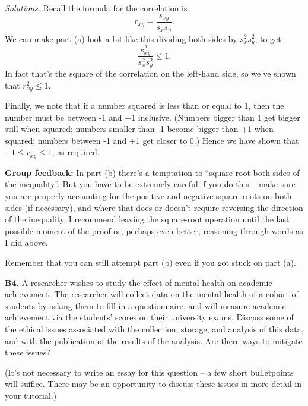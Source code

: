 \documentclass[
  a4paper,
]{book}
\theoremstyle{definition}
\theoremstyle{definition}
\theoremstyle{definition}
\theoremstyle{definition}
\theoremstyle{remark}
\begin{document}
\begin{myanswers}
\emph{Solutions.}
Recall the formula for the correlation is
\[ r_{xy} = \frac{s_{xy}}{s_xs_y} . \]
We can make part (a) look a bit like this dividing both sides by \(s_x^2 s_y^2\), to get
\[\frac{s_{xy}^2}{s_x^2 s_y^2} \leq 1.   \]
In fact that's the square of the correlation on the left-hand side, so we've shown that \(r_{xy}^2 \leq 1\).

Finally, we note that if a number squared is less than or equal to 1, then the number must be between -1 and +1 inclusive. (Numbers bigger than 1 get bigger still when squared; numbers smaller than -1 become bigger than +1 when squared; numbers between -1 and +1 get closer to 0.) Hence we have shown that \(-1 \leq r_{xy} \leq 1\), as required.

\textbf{Group feedback:} In part (b) there's a temptation to ``square-root both sides of the inequality''. But you have to be extremely careful if you do this -- make sure you are properly accounting for the positive and negative square roots on both sides (if necessary), and where that does or doesn't require reversing the direction of the inequality. I recommend leaving the square-root operation until the last possible moment of the proof or, perhaps even better, reasoning through words as I did above.

Remember that you can still attempt part (b) even if you got stuck on part (a).

\end{myanswers}

\textbf{B4.} A researcher wishes to study the effect of mental health on academic achievement. The researcher will collect data on the mental health of a cohort of students by asking them to fill in a questionnaire, and will measure academic achievement via the students' scores on their university exams. Discuss some of the ethical issues associated with the collection, storage, and analysis of this data, and with the publication of the results of the analysis. Are there ways to mitigate these issues?

(It's not necessary to write an essay for this question -- a few short bulletpoints will suffice. There may be an opportunity to discuss these issues in more detail in your tutorial.)
\end{document}
